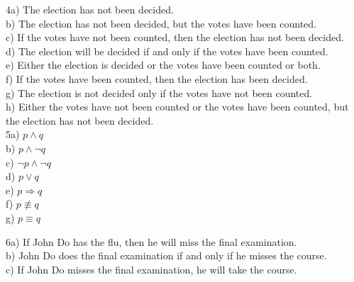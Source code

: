 \documentclass{article}
\begin{document}
\newpage

4a) The election has not been decided. \\

b) The election has not been decided, but the votes have been counted. \\

c) If the votes have not been counted, then the election has not been decided. \\

d) The election will be decided if and only if the votes have been counted. \\

e) Either the election is decided or the votes have been counted or both. \\

f) If the votes have been counted, then the election has been decided. \\

g) The election is not decided only if the votes have not been counted. \\

h) Either the votes have not been counted or the votes have been counted, but the election has not been decided. \\

\vspace{10mm}
5a) \( p \land q \) \\

b) \( p \land \neg q \) \\

c) \( \neg p \land \neg q \) \\

d) \( p \vee q \) \\

e) \( p \Longrightarrow q \) \\

f) \( p \not\equiv q \) \\

g) \( p \equiv q \) \\

\newpage

6a) If John Do has the flu, then he will miss the final examination. \\

b) John Do does the final examination if and only if he misses the course. \\

c) If John Do misses the final examination, he will take the course. \\
\end{document}
